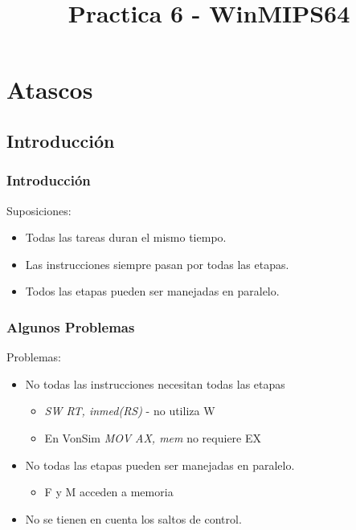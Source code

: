 \documentclass{beamer}
\title{Practica 6 - WinMIPS64}
\begin{document}
\section{Atascos}

\subsection{Introducción}
\begin{frame}
\frametitle{Introducción}
Suposiciones:
\begin{itemize}
\item Todas las tareas duran el mismo tiempo.
\item Las instrucciones siempre pasan por todas las etapas.
\item Todos las etapas pueden ser manejadas en paralelo.
\end{itemize}
\end{frame}

\begin{frame}
\frametitle{Algunos Problemas}
Problemas:
\begin{itemize}
\item  No todas las instrucciones necesitan todas las etapas
\begin{itemize}
\item \emph{SW RT, inmed(RS)} -  no utiliza W
\item En VonSim \emph{MOV AX, mem} no requiere EX
\end{itemize}
 \item No todas las etapas pueden ser manejadas en paralelo.
\begin{itemize}
\item F y M acceden a memoria
\end{itemize}
\item No se tienen en cuenta los saltos de control.
\end{itemize}
\end{frame}
\end{document}

